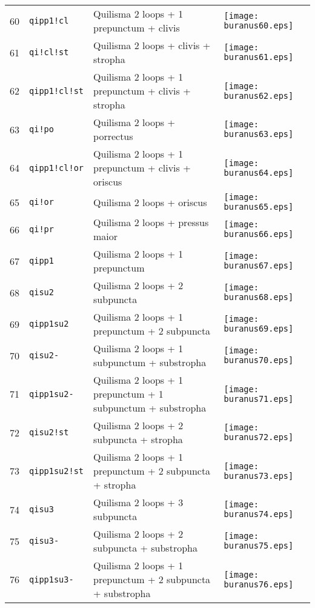 \documentclass{scrarticle}
\begin{document}
\begin{longtable}{l|l|l|l}
60 & \texttt{qipp1!cl} & Quilisma 2 loops + 1 prepunctum + clivis & \texttt{[image: buranus60.eps]} \\
61 & \texttt{qi!cl!st} & Quilisma 2 loops + clivis + stropha & \texttt{[image: buranus61.eps]} \\
62 & \texttt{qipp1!cl!st} & Quilisma 2 loops + 1 prepunctum + clivis + stropha & \texttt{[image: buranus62.eps]} \\
63 & \texttt{qi!po} & Quilisma 2 loops + porrectus & \texttt{[image: buranus63.eps]} \\
64 & \texttt{qipp1!cl!or} & Quilisma 2 loops + 1 prepunctum + clivis + oriscus & \texttt{[image: buranus64.eps]} \\
65 & \texttt{qi!or} & Quilisma 2 loops + oriscus & \texttt{[image: buranus65.eps]} \\
66 & \texttt{qi!pr} & Quilisma 2 loops + pressus maior & \texttt{[image: buranus66.eps]} \\
67 & \texttt{qipp1} & Quilisma 2 loops + 1 prepunctum & \texttt{[image: buranus67.eps]} \\
68 & \texttt{qisu2} & Quilisma 2 loops + 2 subpuncta & \texttt{[image: buranus68.eps]} \\
69 & \texttt{qipp1su2} & Quilisma 2 loops + 1 prepunctum + 2 subpuncta & \texttt{[image: buranus69.eps]} \\
70 & \texttt{qisu2-} & Quilisma 2 loops + 1 subpunctum + substropha & \texttt{[image: buranus70.eps]} \\
71 & \texttt{qipp1su2-} & Quilisma 2 loops + 1 prepunctum + 1 subpunctum + substropha & \texttt{[image: buranus71.eps]} \\
72 & \texttt{qisu2!st} & Quilisma 2 loops + 2 subpuncta + stropha & \texttt{[image: buranus72.eps]} \\
73 & \texttt{qipp1su2!st} & Quilisma 2 loops + 1 prepunctum + 2 subpuncta + stropha & \texttt{[image: buranus73.eps]} \\
74 & \texttt{qisu3} & Quilisma 2 loops + 3 subpuncta & \texttt{[image: buranus74.eps]} \\
75 & \texttt{qisu3-} & Quilisma 2 loops + 2 subpuncta + substropha & \texttt{[image: buranus75.eps]} \\
76 & \texttt{qipp1su3-} & Quilisma 2 loops + 1 prepunctum + 2 subpuncta + substropha & \texttt{[image: buranus76.eps]} \\

\end{longtable}
\end{document}
